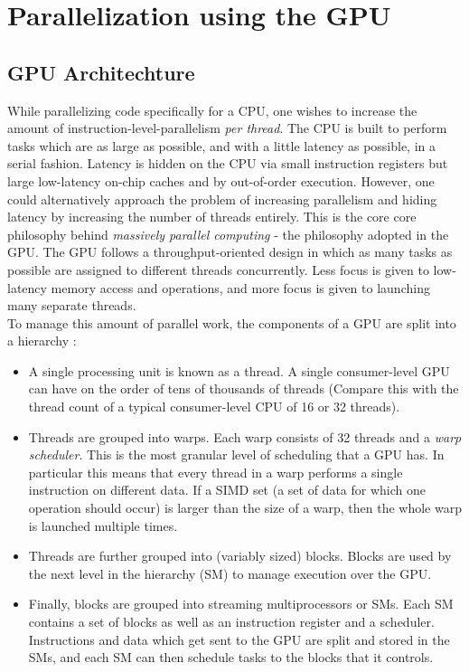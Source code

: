 \section{Parallelization using the GPU}


\subsection{GPU Architechture}

While parallelizing code specifically for a CPU, one wishes to increase the amount of 
instruction-level-parallelism \emph{per thread}. The CPU is built to perform tasks which 
are as large as possible, and with a little latency as possible, in a serial fashion. 
Latency is hidden on the CPU via small instruction registers but large low-latency on-chip 
caches and by out-of-order 
execution. However, one could alternatively approach the problem of increasing  parallelism 
and hiding latency by increasing the number of threads entirely. This is the core core 
philosophy behind \emph{massively parallel computing} - the philosophy adopted in the GPU. 
The GPU follows a throughput-oriented design in which as many tasks as possible are 
assigned to different threads concurrently. Less focus is given to low-latency memory 
access and operations, and more focus is given to launching many separate threads. \\

To manage this amount of parallel work, the components of a GPU are split into a 
hierarchy \cite*{gpuarch, gpuarch2, solvercomp}: 

\begin{itemize}
    \item A single processing unit is known as a thread. A single consumer-level GPU can 
    have on the order of tens of thousands of threads (Compare this with the thread count 
    of a typical consumer-level CPU of 16 or 32 threads). 
    \item Threads are grouped into warps. Each warp consists of 32 threads and a 
    \emph{warp scheduler}. This is the most granular level of scheduling that a GPU has. 
    In particular this means that every thread in a warp performs a single instruction 
    on different data. If a SIMD set (a set of data for which one operation should occur) 
    is larger than the size of a warp, then the whole warp is launched multiple times. 
    \item Threads are further grouped into (variably sized) blocks. Blocks are used by 
    the next level in the hierarchy (SM) to manage execution over the GPU.
    \item Finally, blocks are grouped into streaming multiprocessors or SMs. Each SM 
    contains a set of blocks as well as an instruction register and a scheduler. Instructions 
    and data which get sent to the GPU are split and stored in the SMs, and each SM can 
    then schedule tasks to the blocks that it controls. 
\end{itemize}


